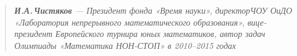 \begin{quote}
\itshape {\bfseries И.А.\,Чистяков} — Президент фонда «Время науки», директор\linebreak ЧОУ ОиДО «Лаборатория непрерывного математического образования», вице-президент Европейского турнира юных математиков, автор задач Олимпиады «Математика НОН-СТОП» в 2010–2015 годах
\end{quote}